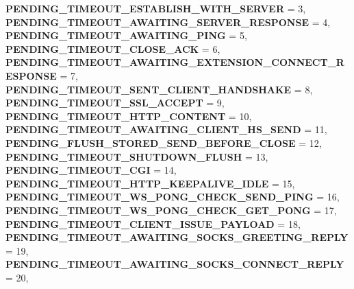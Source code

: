 \begin{DoxyCompactItemize}
{\bfseries P\+E\+N\+D\+I\+N\+G\+\_\+\+T\+I\+M\+E\+O\+U\+T\+\_\+\+E\+S\+T\+A\+B\+L\+I\+S\+H\+\_\+\+W\+I\+T\+H\+\_\+\+S\+E\+R\+V\+ER} = 3, 
\newline
{\bfseries P\+E\+N\+D\+I\+N\+G\+\_\+\+T\+I\+M\+E\+O\+U\+T\+\_\+\+A\+W\+A\+I\+T\+I\+N\+G\+\_\+\+S\+E\+R\+V\+E\+R\+\_\+\+R\+E\+S\+P\+O\+N\+SE} = 4, 
{\bfseries P\+E\+N\+D\+I\+N\+G\+\_\+\+T\+I\+M\+E\+O\+U\+T\+\_\+\+A\+W\+A\+I\+T\+I\+N\+G\+\_\+\+P\+I\+NG} = 5, 
{\bfseries P\+E\+N\+D\+I\+N\+G\+\_\+\+T\+I\+M\+E\+O\+U\+T\+\_\+\+C\+L\+O\+S\+E\+\_\+\+A\+CK} = 6, 
{\bfseries P\+E\+N\+D\+I\+N\+G\+\_\+\+T\+I\+M\+E\+O\+U\+T\+\_\+\+A\+W\+A\+I\+T\+I\+N\+G\+\_\+\+E\+X\+T\+E\+N\+S\+I\+O\+N\+\_\+\+C\+O\+N\+N\+E\+C\+T\+\_\+\+R\+E\+S\+P\+O\+N\+SE} = 7, 
\newline
{\bfseries P\+E\+N\+D\+I\+N\+G\+\_\+\+T\+I\+M\+E\+O\+U\+T\+\_\+\+S\+E\+N\+T\+\_\+\+C\+L\+I\+E\+N\+T\+\_\+\+H\+A\+N\+D\+S\+H\+A\+KE} = 8, 
{\bfseries P\+E\+N\+D\+I\+N\+G\+\_\+\+T\+I\+M\+E\+O\+U\+T\+\_\+\+S\+S\+L\+\_\+\+A\+C\+C\+E\+PT} = 9, 
{\bfseries P\+E\+N\+D\+I\+N\+G\+\_\+\+T\+I\+M\+E\+O\+U\+T\+\_\+\+H\+T\+T\+P\+\_\+\+C\+O\+N\+T\+E\+NT} = 10, 
{\bfseries P\+E\+N\+D\+I\+N\+G\+\_\+\+T\+I\+M\+E\+O\+U\+T\+\_\+\+A\+W\+A\+I\+T\+I\+N\+G\+\_\+\+C\+L\+I\+E\+N\+T\+\_\+\+H\+S\+\_\+\+S\+E\+ND} = 11, 
\newline
{\bfseries P\+E\+N\+D\+I\+N\+G\+\_\+\+F\+L\+U\+S\+H\+\_\+\+S\+T\+O\+R\+E\+D\+\_\+\+S\+E\+N\+D\+\_\+\+B\+E\+F\+O\+R\+E\+\_\+\+C\+L\+O\+SE} = 12, 
{\bfseries P\+E\+N\+D\+I\+N\+G\+\_\+\+T\+I\+M\+E\+O\+U\+T\+\_\+\+S\+H\+U\+T\+D\+O\+W\+N\+\_\+\+F\+L\+U\+SH} = 13, 
{\bfseries P\+E\+N\+D\+I\+N\+G\+\_\+\+T\+I\+M\+E\+O\+U\+T\+\_\+\+C\+GI} = 14, 
{\bfseries P\+E\+N\+D\+I\+N\+G\+\_\+\+T\+I\+M\+E\+O\+U\+T\+\_\+\+H\+T\+T\+P\+\_\+\+K\+E\+E\+P\+A\+L\+I\+V\+E\+\_\+\+I\+D\+LE} = 15, 
\newline
{\bfseries P\+E\+N\+D\+I\+N\+G\+\_\+\+T\+I\+M\+E\+O\+U\+T\+\_\+\+W\+S\+\_\+\+P\+O\+N\+G\+\_\+\+C\+H\+E\+C\+K\+\_\+\+S\+E\+N\+D\+\_\+\+P\+I\+NG} = 16, 
{\bfseries P\+E\+N\+D\+I\+N\+G\+\_\+\+T\+I\+M\+E\+O\+U\+T\+\_\+\+W\+S\+\_\+\+P\+O\+N\+G\+\_\+\+C\+H\+E\+C\+K\+\_\+\+G\+E\+T\+\_\+\+P\+O\+NG} = 17, 
{\bfseries P\+E\+N\+D\+I\+N\+G\+\_\+\+T\+I\+M\+E\+O\+U\+T\+\_\+\+C\+L\+I\+E\+N\+T\+\_\+\+I\+S\+S\+U\+E\+\_\+\+P\+A\+Y\+L\+O\+AD} = 18, 
{\bfseries P\+E\+N\+D\+I\+N\+G\+\_\+\+T\+I\+M\+E\+O\+U\+T\+\_\+\+A\+W\+A\+I\+T\+I\+N\+G\+\_\+\+S\+O\+C\+K\+S\+\_\+\+G\+R\+E\+E\+T\+I\+N\+G\+\_\+\+R\+E\+P\+LY} = 19, 
\newline
{\bfseries P\+E\+N\+D\+I\+N\+G\+\_\+\+T\+I\+M\+E\+O\+U\+T\+\_\+\+A\+W\+A\+I\+T\+I\+N\+G\+\_\+\+S\+O\+C\+K\+S\+\_\+\+C\+O\+N\+N\+E\+C\+T\+\_\+\+R\+E\+P\+LY} = 20, 

\end{DoxyCompactItemize}

